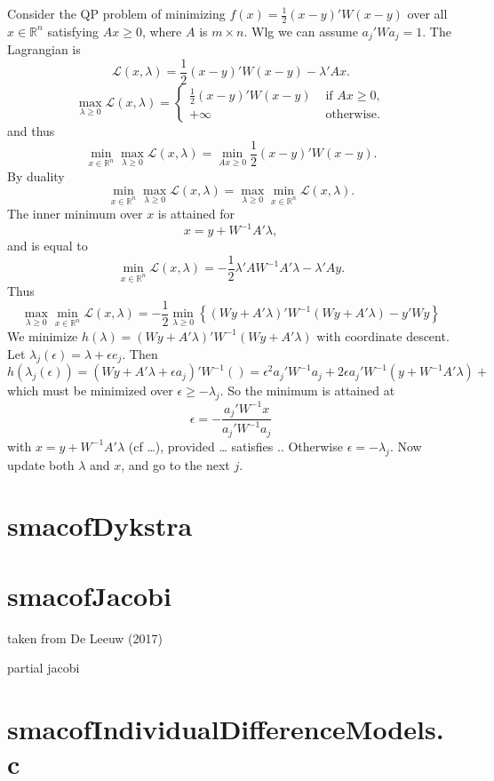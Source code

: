 \documentclass[
  12pt,
]{article}
\newcommand{\eps}{\epsilon}
\begin{document}
Consider the QP problem of minimizing \(f(x)=\frac12(x-y)'W(x-y)\)
over all \(x\in\mathbb{R}^n\) satisfying \(Ax\geq 0\), where \(A\) is \(m\times n\). Wlg we can assume \(a_j'Wa_j=1\). The Lagrangian is
\[
\mathcal{L}(x,\lambda)=\frac12(x-y)'W(x-y)-\lambda'Ax.
\]
\[
\max_{\lambda\geq 0}\mathcal{L}(x,\lambda)=\begin{cases}\frac12(x-y)'W(x-y)&\text{ if }Ax\geq 0,\\
+\infty&\text{ otherwise}.\end{cases}
\]
and thus
\[
\min_{x\in\mathbb{R}^n}\max_{\lambda\geq 0}\mathcal{L}(x,\lambda)=\min_{Ax\geq 0}\frac12(x-y)'W(x-y).
\]
By duality
\[
\min_{x\in\mathbb{R}^n}\max_{\lambda\geq 0}\mathcal{L}(x,\lambda)=\max_{\lambda\geq 0}\min_{x\in\mathbb{R}^n}\mathcal{L}(x,\lambda).
\]
The inner minimum over \(x\) is attained for
\[
x=y+W^{-1}A'\lambda,
\]
and is equal to
\[
\min_{x\in\mathbb{R}^n}\mathcal{L}(x,\lambda)=-\frac12\lambda'AW^{-1}A'\lambda-\lambda'Ay.
\]
Thus
\[
\max_{\lambda\geq 0}\min_{x\in\mathbb{R}^n}\mathcal{L}(x,\lambda)=
-\frac12\min_{\lambda\geq 0}\left\{(Wy+A'\lambda)'W^{-1}(Wy+A'\lambda)-y'Wy\right\}
\]
We minimize \(h(\lambda)=(Wy+A'\lambda)'W^{-1}(Wy+A'\lambda)\) with coordinate descent. Let \(\lambda_j(\eps)=\lambda+\eps e_j\). Then
\[
h(\lambda_j(\eps))=(Wy+A'\lambda+\eps a_j)'W^{-1}()=\eps^2a_j'W^{-1}a_j+2\eps a_j'W^{-1}(y+W^{-1}A'\lambda)+
\]
which must be minimized over \(\eps\geq-\lambda_j\). So the minimum is attained at
\[
\eps=-\frac{a_j'W^{-1}x}{a_j'W^{-1}a_j}
\]
with \(x=y+W^{-1}A'\lambda\) (cf \ldots), provided \ldots{} satisfies .. Otherwise \(\eps=-\lambda_j\). Now update both \(\lambda\) and \(x\),
and go to the next \(j\).

\section{smacofDykstra}\label{smacofdykstra}

\section{smacofJacobi}\label{smacofjacobi}

taken from De Leeuw (2017)

partial jacobi

\section{smacofIndividualDifferenceModels.c}\label{smacofindividualdifferencemodels.c}
\end{document}
